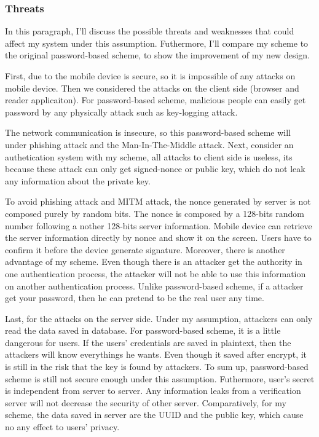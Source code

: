 \begin{CJK}{Bg5}{bsmi}
\subsubsection{Threats}

In this paragraph, I'll discuss the possible threats and weaknesses that could affect my system under this assumption. Futhermore, I'll compare my scheme to the original password-based scheme, to show the improvement of my new design.

First, due to the mobile device is secure, so it is impossible of any attacks on mobile device. Then we considered the attacks on the client side (browser and reader applicaiton). For password-based scheme, malicious people can easily get password by any physically attack such as key-logging attack. 

The network communication is insecure, so this password-based scheme will under phishing attack and the Man-In-The-Middle attack. Next, consider an authetication system with my scheme, all attacks to client side is useless, its because these attack can only get signed-nonce or public key, which do not leak any information about the private key. 

To avoid phishing attack and MITM attack, the nonce generated by server is not composed purely by random bits. The nonce is composed by a 128-bits random number following a nother 128-bits server information. Mobile device can retrieve the server information directly by nonce and show it on the screen. Users have to confirm it before the device generate signature. Moreover, there is another advantage of my scheme. Even though there is an attacker get the authority in one authentication process, the attacker will not be able to use this information on another authentication process. Unlike password-based scheme, if a attacker get your password, then he can pretend to be the real user any time.

Last, for the attacks on the server side. Under my assumption, attackers can only read the data saved in database. For password-based scheme, it is a little dangerous for users. If the users' credentials are saved in plaintext, then the attackers will know everythings he wants. Even though it saved after encrypt, it is still in the risk that the key is found by attackers. To sum up, password-based scheme is still not secure enough under this assumption. Futhermore, user's secret is independent from server to server. Any information leaks from a verification server will not decrease the security of other server. Comparatively, for my scheme, the data saved in server are the UUID and the public key, which cause no any effect to users' privacy.


\end{CJK}
